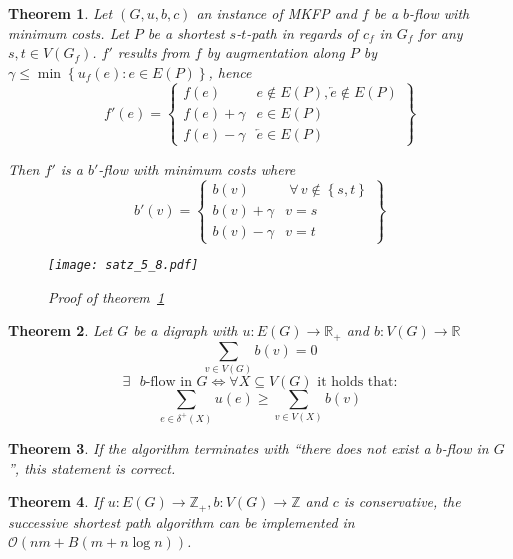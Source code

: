 \documentclass{article}
\newtheorem{theorem}{Theorem}
\newcommand{\set}[1]{\left\{#1\right\}}
\newcommand{\gath}[2]{$#1$-$#2$-path} %
\newcommand{\fall}{\;\forall\,}
\begin{document}
\begin{theorem}\label{satz-5.8}
  Let $(G, u, b, c)$ an instance of MKFP and $f$ be a $b$-flow with minimum costs.
  Let $P$ be a shortest \gath st in regards of $c_f$ in $G_f$ for any $s, t \in V(G_f)$.
  $f'$ results from $f$ by augmentation along $P$ by $\gamma \leq \min\set{u_f(e): e \in E(P)}$,
  hence
  \[
    f'(e) = \left\{\begin{array}{lc}
      f(e) & e \notin E(P), \overleftarrow{e} \notin E(P) \\
      f(e) + \gamma & e \in E(P) \\
      f(e) - \gamma & \overleftarrow{e} \in E(P)
    \end{array}\right\}
  \]

  Then $f'$ is a $b'$-flow with minimum costs where
  \[
    b'(v) = \left\{\begin{array}{lc}
      b(v) & \fall v \notin \set{s,t} \\
      b(v) + \gamma & v = s \\
      b(v) - \gamma & v = t
    \end{array}\right\}
  \]

  \begin{figure}[ht]
   \begin{center}
    \texttt{[image: satz\_5\_8.pdf]}
    \caption{Proof of theorem~\ref{satz-5.8}}
   \end{center}
  \end{figure}
\end{theorem}
\begin{theorem}\label{lemma-5.10}
  Let $G$ be a digraph with $u: E(G) \rightarrow \mathbb{R}_+$ and $b: V(G) \rightarrow \mathbb{R}$
  \[ \sum_{v \in V(G)} b(v) = 0 \]
  \begin{equation*}
    \exists \text{ $b$-flow in } G \Leftrightarrow \forall X \subseteq V(G) \text{ it holds that:}
  \end{equation*} \begin{equation*}
    \sum_{e \in \delta^+(X)} u(e) \geq \sum_{v \in V(X)} b(v)
  \end{equation*}
\end{theorem}
\begin{theorem}\label{proposition-5.9}
  If the algorithm terminates with ``there does not exist a $b$-flow in $G$'',
  this statement is correct.
\end{theorem}
\begin{theorem}\label{satz-5.10}
  If $u: E(G) \rightarrow \mathbb{Z}_+, b: V(G) \rightarrow \mathbb{Z}$ and $c$ is conservative,
  the successive shortest path algorithm can be implemented in $\mathcal{O}(nm + B(m + n \log{n}))$.
\end{theorem}
\end{document}
